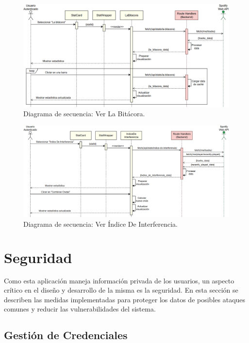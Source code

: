 \begin{figure}[H]
    \centering
    \includegraphics[width=\textwidth]{figures/diagramas_secuencia/ds_ver_la_bitacora.png}
    \caption{Diagrama de secuencia: Ver La Bitácora.}
    \label{fig:ds_ver_la_bitacora}
\end{figure}

\begin{figure}[H]
    \centering
    \includegraphics[width=\textwidth]{figures/diagramas_secuencia/ds_ver_indice_de_interferencia.png}
    \caption{Diagrama de secuencia: Ver Índice De Interferencia.}
    \label{fig:ds_ver_indice_de_interferencia}
\end{figure}

\section{Seguridad}

Como esta aplicación maneja información privada de los usuarios, un aspecto crítico en el diseño y desarrollo de la misma es la seguridad. En esta sección se describen las medidas implementadas para proteger los datos de posibles ataques comunes y reducir las vulnerabilidades del sistema.

\subsection{Gestión de Credenciales}

